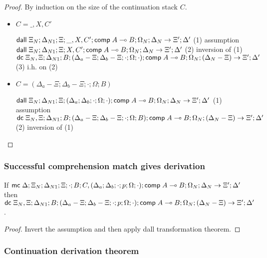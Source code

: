 \begin{proof}
   By induction on the size of the continuation stack $C$.
   
   \begin{itemize}
      \item $C = \_, X, C'$
      
      $\mathsf{dall} \; \Xi_N; \Delta_{N1}; \Xi; \_, X, C'; \mathsf{comp} \; A \multimap B; \Omega_N; \Delta_N \rightarrow \Xi'; \Delta'$ \hfill (1) assumption \\
      $\mathsf{dall} \; \Xi_N; \Delta_{N1}; \Xi; X, C'; \mathsf{comp} \; A \multimap B; \Omega_N; \Delta_N \rightarrow \Xi'; \Delta'$ \hfill (2) inversion of (1) \\
      $\mathsf{dc} \; \Xi_N, \Xi; \Delta_{N1}; B; (\Delta_a - \Xi; \Delta_b - \Xi; \cdot; \Omega; \cdot); \mathsf{comp} \; A \multimap B; \Omega_N; (\Delta_N - \Xi) \rightarrow \Xi'; \Delta'$ \hfill (3) i.h. on (2) \\
      
      \item $C = (\Delta_a - \Xi; \Delta_b - \Xi; \cdot; \Omega; B)$
      
      $\mathsf{dall} \; \Xi_N; \Delta_{N1}; \Xi; (\Delta_a; \Delta_b; \cdot; \Omega; \cdot); \mathsf{comp} \; A \multimap B; \Omega_N; \Delta_N \rightarrow \Xi'; \Delta'$ \hfill (1) assumption \\
      $\mathsf{dc} \; \Xi_N, \Xi; \Delta_{N1}; B; (\Delta_a - \Xi; \Delta_b - \Xi; \cdot; \Omega; B); \mathsf{comp} \; A \multimap B; \Omega_N; (\Delta_N - \Xi) \rightarrow \Xi'; \Delta'$ \hfill (2) inversion of (1) \\
   \end{itemize}
\end{proof}

\subsubsection{Successful comprehension match gives derivation}

If $\mathsf{mc} \; \Delta; \Xi_N; \Delta_{N1}; \Xi; \cdot; B; C, (\Delta_a; \Delta_b; \cdot; p; \Omega; \cdot); \mathsf{comp} \; A \multimap B; \Omega_N; \Delta_N \rightarrow \Xi'; \Delta'$ then
$\mathsf{dc} \; \Xi_N, \Xi; \Delta_{N1}; B; (\Delta_a - \Xi; \Delta_b - \Xi; \cdot; p; \Omega; \cdot); \mathsf{comp} \; A \multimap B; \Omega_N; (\Delta_N - \Xi) \rightarrow \Xi'; \Delta'$.

\begin{proof}
   Invert the assumption and then apply dall transformation theorem.
\end{proof}

\subsubsection{Continuation derivation theorem}


